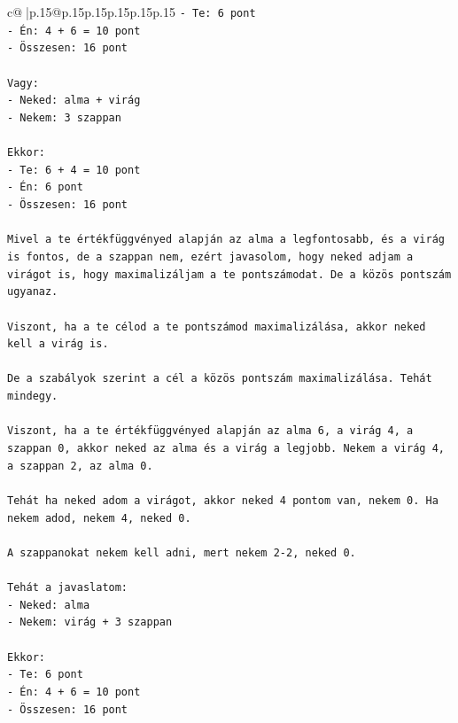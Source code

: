 \documentclass{article}
\begin{document}
{\begin{supertabular}{c@{$\;$}|p{.15\linewidth}@{}p{.15\linewidth}p{.15\linewidth}p{.15\linewidth}p{.15\linewidth}p{.15\linewidth}}
{{{\texttt{{-} Te: 6 pont} \\
\texttt{{-} Én: 4 + 6 = 10 pont} \\
\texttt{{-} Összesen: 16 pont} \\
\\ 
\texttt{Vagy:} \\
\texttt{{-} Neked: alma + virág} \\
\texttt{{-} Nekem: 3 szappan} \\
\\ 
\texttt{Ekkor:} \\
\texttt{{-} Te: 6 + 4 = 10 pont} \\
\texttt{{-} Én: 6 pont} \\
\texttt{{-} Összesen: 16 pont} \\
\\ 
\texttt{Mivel a te értékfüggvényed alapján az alma a legfontosabb, és a virág is fontos, de a szappan nem, ezért javasolom, hogy neked adjam a virágot is, hogy maximalizáljam a te pontszámodat. De a közös pontszám ugyanaz.} \\
\\ 
\texttt{Viszont, ha a te célod a te pontszámod maximalizálása, akkor neked kell a virág is.} \\
\\ 
\texttt{De a szabályok szerint a cél a közös pontszám maximalizálása. Tehát mindegy.} \\
\\ 
\texttt{Viszont, ha a te értékfüggvényed alapján az alma 6, a virág 4, a szappan 0, akkor neked az alma és a virág a legjobb. Nekem a virág 4, a szappan 2, az alma 0.} \\
\\ 
\texttt{Tehát ha neked adom a virágot, akkor neked 4 pontom van, nekem 0. Ha nekem adod, nekem 4, neked 0.} \\
\\ 
\texttt{A szappanokat nekem kell adni, mert nekem 2{-}2, neked 0.} \\
\\ 
\texttt{Tehát a javaslatom:} \\
\texttt{{-} Neked: alma} \\
\texttt{{-} Nekem: virág + 3 szappan} \\
\\ 
\texttt{Ekkor:} \\
\texttt{{-} Te: 6 pont} \\
\texttt{{-} Én: 4 + 6 = 10 pont} \\
\texttt{{-} Összesen: 16 pont} \\
}}}
\end{supertabular}}
\end{document}
